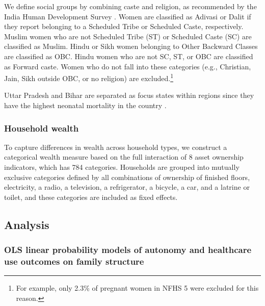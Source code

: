 \documentclass[10pt,twoside,reqno]{article}
\begin{document}
We define social groups by combining caste and religion, as recommended by the India Human Development Survey \citep{desai2008india}. Women are classified as Adivasi or Dalit if they report belonging to a Scheduled Tribe or Scheduled Caste, respectively. Muslim women who are not Scheduled Tribe (ST) or Scheduled Caste (SC) are classified as Muslim. Hindu or Sikh women belonging to Other Backward Classes are classified as OBC. Hindu women who are not SC, ST, or OBC are classified as Forward caste. Women who do not fall into these categories (e.g., Christian, Jain, Sikh outside OBC, or no religion) are excluded.\footnote{For example, only 2.3\% of pregnant women in NFHS 5 were excluded for this reason.} 

Uttar Pradesh and Bihar are separated as focus states within regions since they have the highest neonatal mortality in the country \citep{coffey2025excess}. 

\subsubsection*{Household wealth} \label{sec:wealthcontrols}

To capture differences in wealth across household types, we construct a categorical wealth measure based on the full interaction of 8 asset ownership indicators, which has 784 categories. Households are grouped into mutually exclusive categories defined by all combinations of ownership of finished floors, electricity, a radio, a television, a refrigerator, a bicycle, a car, and a latrine or toilet, and these categories are included as fixed effects.

\subsection*{Analysis}
\subsubsection*{OLS linear probability models of autonomy and healthcare use outcomes on family structure}
\end{document}
